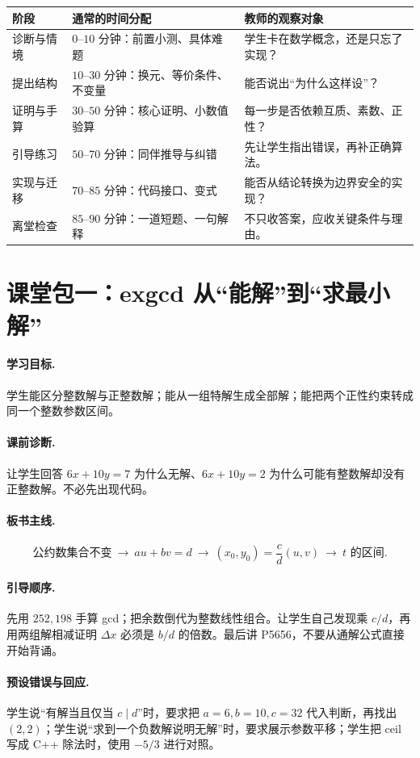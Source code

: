 \begin{longtable}{p{}p{}p{}}
\toprule
阶段 & 通常的时间分配 & 教师的观察对象\\\midrule
诊断与情境 & $0$--$10$ 分钟：前置小测、具体难题 & 学生卡在数学概念，还是只忘了实现？\\
提出结构 & $10$--$30$ 分钟：换元、等价条件、不变量 & 能否说出“为什么这样设”？\\
证明与手算 & $30$--$50$ 分钟：核心证明、小数值验算 & 每一步是否依赖互质、素数、正性？\\
引导练习 & $50$--$70$ 分钟：同伴推导与纠错 & 先让学生指出错误，再补正确算法。\\
实现与迁移 & $70$--$85$ 分钟：代码接口、变式 & 能否从结论转换为边界安全的实现？\\
离堂检查 & $85$--$90$ 分钟：一道短题、一句解释 & 不只收答案，应收关键条件与理由。\\
\bottomrule
\end{longtable}

\section{课堂包一：exgcd 从“能解”到“求最小解”}
\paragraph{学习目标.} 学生能区分整数解与正整数解；能从一组特解生成全部解；能把两个正性约束转成同一个整数参数区间。
\paragraph{课前诊断.} 让学生回答 $6x+10y=7$ 为什么无解、$6x+10y=2$ 为什么可能有整数解却没有正整数解。不必先出现代码。
\paragraph{板书主线.}
\[
\text{公约数集合不变}\ \longrightarrow\ au+bv=d
\ \longrightarrow\ (x_0,y_0)=\frac cd(u,v)
\ \longrightarrow\ t\text{ 的区间}.
\]
\paragraph{引导顺序.}
先用 $252,198$ 手算 gcd；把余数倒代为整数线性组合。让学生自己发现乘 $c/d$，再用两组解相减证明 $\Delta x$ 必须是 $b/d$ 的倍数。最后讲 P5656，不要从通解公式直接开始背诵。
\paragraph{预设错误与回应.}
学生说“有解当且仅当 $c\mid d$”时，要求把 $a=6,b=10,c=32$ 代入判断，再找出 $(2,2)$；学生说“求到一个负数解说明无解”时，要求展示参数平移；学生把 ceil 写成 C++ 除法时，使用 $-5/3$ 进行对照。

